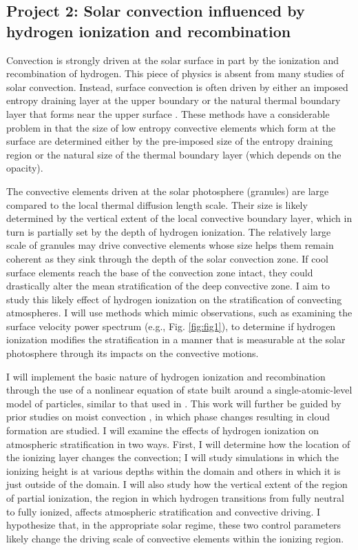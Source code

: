 \documentclass[aasms,12pt]{article}
\begin{document}
\vspace{-0.25cm}
\subsection{Project 2: Solar convection influenced by hydrogen ionization and recombination}
\vspace{-0.15cm}
Convection is strongly driven at the solar surface in part by the ionization and recombination of hydrogen.
This piece of physics is absent from many studies of solar convection. Instead, surface convection
is often driven by either an imposed entropy draining layer at the upper boundary \citep{kapyla&all2017}
or the natural thermal boundary layer that forms near the upper surface \citep{anders&brown2017}.
These methods have a considerable problem in that the size of low entropy
convective elements which form at the surface are determined either by the pre-imposed size of the
entropy draining region or the natural size of the thermal boundary layer (which depends on
the opacity).

The convective elements driven at the solar photosphere (granules) are large compared to the local
thermal diffusion length scale.  Their size is likely determined by the vertical extent of the local convective
boundary layer, which in turn is partially set by the depth of hydrogen ionization.  The relatively large
scale of granules may drive convective elements whose size helps them remain coherent as they sink through the depth of the solar
convection zone. If cool surface elements reach the base of the convection zone intact, they could drastically
alter the mean stratification of the deep convective zone.  
I aim to study this likely effect of hydrogen ionization on the stratification of convecting atmospheres.
I will use methods which mimic observations, such as examining the surface velocity power spectrum 
(e.g., Fig. \ref{fig:fig1}), to determine if hydrogen ionization modifies the stratification in a manner that
is measurable at the solar photosphere through its impacts on the convective motions.

I will implement the basic nature of hydrogen ionization and recombination through the use of
a nonlinear equation of state built around a single-atomic-level model of particles,
similar to that used in \cite{rast&toomre1993}.
This work will further be guided by prior studies on moist convection \citep{leconte&all2017},
in which phase changes resulting in cloud formation are studied. I will examine the effects of
hydrogen ionization on atmospheric stratification in two ways.  First, I will determine how the
location of the ionizing layer changes the convection; I will study simulations in which the ionizing
height is at various depths within the domain and others in which it is just outside of the domain.
I will also study
how the vertical extent of the region of partial ionization, the region in which hydrogen transitions
from fully neutral to fully ionized, affects atmospheric stratification and convective driving.
I hypothesize that, in the appropriate solar regime,
these two control parameters likely change the driving scale of convective elements within the
ionizing region. 
\end{document}
